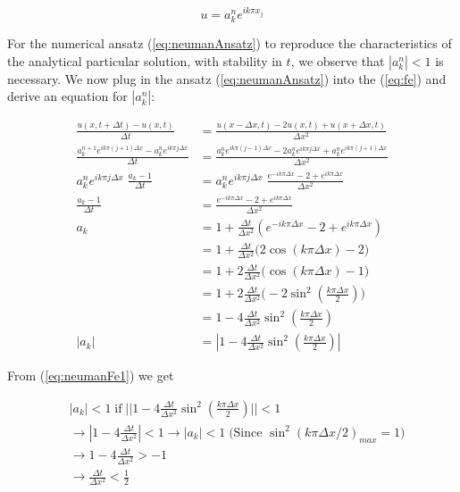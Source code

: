 \documentclass{article}
\begin{document}
\begin{equation}\label{eq:neumanAnsatz}
	u = a_k^n e^{i k \pi x_j}
\end{equation}

For the numerical ansatz (\ref{eq:neumanAnsatz}) to reproduce the characteristics of the analytical particular solution, with stability in $t$, we observe that $|a_k^n| < 1$ is necessary. We now plug in the ansatz (\ref{eq:neumanAnsatz}) into the (\ref{eq:fe}) and derive an equation for $|a_k^n|$:

\begin{subequations}\label{eq:naumanFe0}
	\begin{align}
		\frac{u(x, t+ \Delta t) - u(x,t)}{\Delta t}  &= 
		\frac{u(x - \Delta x, t) - 2u(x,t) + u(x+ \Delta x, t)}{\Delta x^2} \\
		\frac{a_k^{n+1} e^{i k \pi (j+1) \Delta x} - a_k^n e^{i k \pi j \Delta x}}{\Delta t}  &= 
		\frac{a_k^{n} e^{i k \pi (j-1) \Delta x} - 2a_k^{n} e^{i k \pi j \Delta x} + a_k^{n} e^{i k \pi (j+1) \Delta x}}{\Delta x^2} \\
		a_k^{n} e^{i k \pi j \Delta x}\; \frac{a_k  -1}{\Delta t}  &= 
		a_k^{n} e^{i k \pi j \Delta x}\; \frac{ e^{-i k \pi \Delta x} - 2  +  e^{i k \pi  \Delta x}}{\Delta x^2} \\
		 \frac{a_k  -1}{\Delta t}  &= 
		 \frac{ e^{-i k \pi \Delta x} - 2  +  e^{i k \pi  \Delta x}}{\Delta x^2} \\
		 a_k &= 1 + \frac{\Delta t}{\Delta x^2} (e^{-i k \pi \Delta x} - 2  +  e^{i k \pi  \Delta x})\\
		 &= 1+ \frac{\Delta t}{\Delta x^2} \Big(2 \cos(k\pi\Delta x) - 2\Big)\\
		 &= 1+ 2\frac{\Delta t}{\Delta x^2} \Big( \cos(k\pi\Delta x) - 1\Big)\\
		 &= 1+ 2\frac{\Delta t}{\Delta x^2} \Big(- 2 \sin^2(\frac{k\pi\Delta x}{2}) \Big)\\
		 &=1 - 4\frac{\Delta t}{\Delta x^2} \sin^2(\frac{k\pi\Delta x}{2}) \\
		 |a_k| &= |1 - 4\frac{\Delta t}{\Delta x^2} \sin^2(\frac{k\pi\Delta x}{2})|\label{eq:neumanFe1}
	\end{align}
\end{subequations}

From (\ref{eq:neumanFe1}) we get
 
\begin{subequations}
	\begin{align}
		 &|a_k| < 1\; \text{if}\; ||1 - 4\frac{\Delta t}{\Delta x^2} \sin^2(\frac{k\pi\Delta x}{2})|| < 1 \\
		 &\rightarrow |1 - 4 \frac{\Delta t}{\Delta x^2}| < 1 \rightarrow |a_k| < 1\;\text{(Since $\sin^2(k \pi \Delta x/2)_{max}  = 1$)}\\
		 &\rightarrow 1 - 4 \frac{\Delta t}{\Delta x^2} > -1\\ 
		 &\rightarrow \frac{\Delta t}{\Delta x^2} < \frac{1}{2}\label{eq:neumanFe2}
	\end{align}
\end{subequations}
\end{document}
